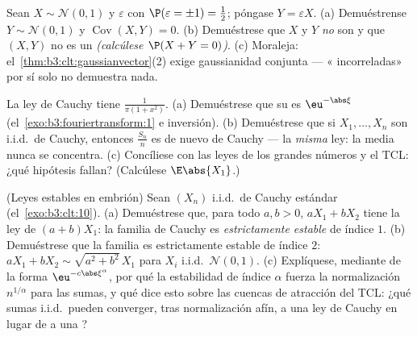 \begin{exercise}[$\star\star\star$]\label{exo:b3:clt:9}
Sean $X \sim \mathcal N(0,1)$ y $\varepsilon$
 con
$\P(\varepsilon = \pm1) = \frac12$; póngase $Y =
\varepsilon X$. (a) Demuéstrense $Y \sim \mathcal N(0,1)$ y
$\operatorname{Cov}(X, Y) = 0$.
(b) Demuéstrese que $X$ y $Y$ \emph{no} son
 y que $(X, Y)$
no es un 
\emph{(calcúlese $\P(X + Y =
0)$)}. (c) Moraleja: el~\cref{thm:b3:clt:gaussianvector}(2) exige
gaussianidad conjunta ---
« incorreladas» por sí
solo no demuestra nada.
\end{exercise}

\begin{exercise}[$\star\star$]\label{exo:b3:clt:10}
La ley de Cauchy tiene 
$\frac1{\pi(1 + x^2)}$. (a) Demuéstrese que su
 es $\eu^{-\abs\xi}$
(el~\cref{exo:b3:fouriertransform:1} e inversión). (b) Demuéstrese que
si $X_1, \dots, X_n$ son i.i.d.\ de Cauchy, entonces $\frac{S_n}n$ es de
nuevo de Cauchy --- la \emph{misma} ley: la media nunca se concentra.
(c) Concíliese con las leyes de los grandes números y el TCL: ¿qué
hipótesis fallan? (Calcúlese $\E\abs{X_1}$.)
\end{exercise}

\begin{exercise}[$\star\star$]\label{exo:b3:clt:11}
(Leyes estables en embrión) Sean $(X_n)$ i.i.d.\ de Cauchy estándar
(el~\cref{exo:b3:clt:10}). (a) Demuéstrese que, para todo $a, b > 0$,
$aX_1 + bX_2$ tiene la ley de $(a + b)X_1$: la familia de Cauchy es
\emph{estrictamente estable} de índice $1$. (b) Demuéstrese que la
familia  es estrictamente
estable de índice $2$: $aX_1 + bX_2 \sim \sqrt{a^2 + b^2}\,X_1$ para
$X_i$ i.i.d.\ $\mathcal N(0,1)$.
(c) Explíquese, mediante  de la forma $\eu^{-c\abs\xi^\alpha}$, por qué la
estabilidad de índice $\alpha$ fuerza la normalización $n^{1/\alpha}$
para las sumas, y qué dice esto sobre las cuencas de atracción del TCL:
¿qué sumas i.i.d.\ pueden converger, tras normalización afín, a una ley
de Cauchy en lugar de a una
?
\end{exercise}

